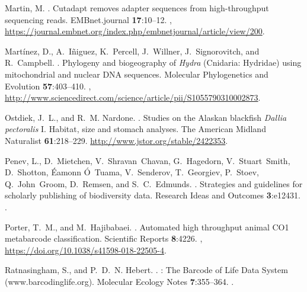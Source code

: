 \begin{multicols}{2}
\begin{thebibliography}{37}
Martin, M.
.
\newblock Cutadapt removes adapter sequences from high-throughput sequencing
  reads.
\newblock EMBnet.journal {\bfseries 17}:10--12.
\newblock {},
  \urlprefix\url{https://journal.embnet.org/index.php/embnetjournal/article/view/200}.

Martínez, D., A.~Iñiguez, K.~Percell, J.~Willner, J.~Signorovitch, and
  R.~Campbell.
.
\newblock Phylogeny and biogeography of \textit{Hydra} ({Cnidaria}: {Hydridae})
  using mitochondrial and nuclear {DNA} sequences.
\newblock Molecular Phylogenetics and Evolution {\bfseries 57}:403--410.
\newblock {},
  \urlprefix\url{http://www.sciencedirect.com/science/article/pii/S1055790310002873}.

Ostdiek, J.~L., and R.~M. Nardone.
.
\newblock Studies on the Alaskan blackfish \textit{Dallia pectoralis} I.
  Habitat, size and stomach analyses.
\newblock The American Midland Naturalist {\bfseries 61}:218--229.
\newblock \urlprefix\url{http://www.jstor.org/stable/2422353}.

Penev, L., D.~Mietchen, V.~Shravan Chavan, G.~Hagedorn, V.~Stuart Smith,
  D.~Shotton, Éamonn Ó~Tuama, V.~Senderov, T.~Georgiev, P.~Stoev,
  Q.~John Groom, D.~Remsen, and S.~C. Edmunds.
.
\newblock Strategies and guidelines for scholarly publishing of biodiversity
  data.
\newblock Research Ideas and Outcomes {\bfseries 3}:e12431.
\newblock {}.

Porter, T.~M., and M.~Hajibabaei.
.
\newblock Automated high throughput animal {CO1} metabarcode classification.
\newblock Scientific Reports {\bfseries 8}:4226.
\newblock {},
  \urlprefix\url{https://doi.org/10.1038/s41598-018-22505-4}.

Ratnasingham, S., and P.~D.~N. Hebert.
.
: {The} {Barcode} of {Life} {Data} {System}
  (www.barcodinglife.org).
\newblock Molecular Ecology Notes {\bfseries 7}:355--364.
\newblock {}.


\end{thebibliography}
\end{multicols}
